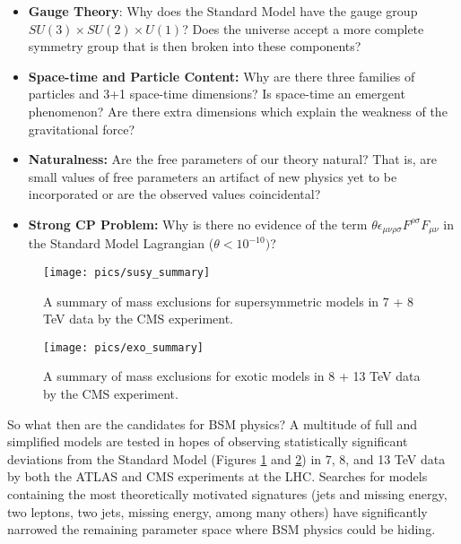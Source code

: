 \begin{itemize}
\item \textbf{Gauge Theory}: Why does the Standard Model have the gauge group $SU(3) \times SU(2) \times U(1)$? Does the universe accept a more complete symmetry group that is then broken into these components? 
\item \textbf{Space-time and Particle Content:} Why are there three families of particles and 3+1 space-time dimensions? Is space-time an emergent phenomenon? Are there extra dimensions which 
explain the weakness of the gravitational force?
\item \textbf{Naturalness:} Are the free parameters of our theory natural? That is, are
small values of free parameters an artifact of new physics yet to be incorporated
or are the observed values coincidental?
\item \textbf{Strong CP Problem:} Why is there no evidence of the term $\theta \epsilon_{\mu\nu\rho\sigma} F^{\rho\sigma} F_{\mu\nu}$ in the Standard Model Lagrangian ($\theta < 10^{-10})$?  
\end{itemize}
\begin{figure}
\begin{center}
\texttt{[image: pics/susy\_summary]}
\end{center}
\caption{A summary of mass exclusions for supersymmetric models in 7 + 8 TeV data by the CMS experiment.}
\label{fig:susy_summary}
\end{figure}
\begin{figure}
\begin{center}
\texttt{[image: pics/exo\_summary]}
\end{center}
\caption{A summary of mass exclusions for exotic models in 8 + 13 TeV data by the CMS experiment.}
\label{fig:exo_summary}
\end{figure}

So what then are the candidates for BSM physics? A multitude of full and simplified models are 
tested in hopes of observing statistically significant deviations from the Standard Model
(Figures \ref{fig:susy_summary} and \ref{fig:exo_summary}) in 7, 8, and 13 TeV data by both
the ATLAS and CMS experiments at the LHC. Searches for models containing the most theoretically motivated
signatures (jets and missing energy, two leptons, two jets, missing energy, among many others) have significantly
narrowed the remaining parameter space where BSM physics could be hiding.

